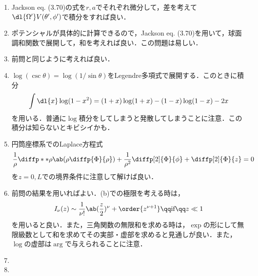 \begin{enumerate}[%
  label=%
  \fbox{%
   {\thesection.\arabic*}%
    },%
    leftmargin=3\parindent]
\begin{enumerate}[(a)]
        これらをまとめて
        \begin{gather}
          \int_0^{2\pi} \dl{\phi} V(\phi) e^{-\i m \phi} = 
          \begin{dcases}
            - \i\frac{4Vn}{m} & \text{if}\qq m = \pm n, \pm 3n, \ldots\\
            \qq 0 &\text{otherwise}
          \end{dcases}
        \end{gather}
        と書ける．
      \item (a)の結果を用いて具体的に計算を進めていくだけであるが，Jackson §3.3 eq. (3.36)との比較の時には座標軸の取り方に気をつける必要がある．具体的には，$\cos\theta' = \sin\theta \sin \phi$とすれば良い．
    \end{enumerate}
  \item Jackson eq. (3.70)の式を$r, a$でそれぞれ微分して，差を考えて$\dl{\Omega'}V(\theta' , \phi')$で積分をすれば良い．
  \item ポテンシャルが具体的に計算できるので，Jackson eq. (3.70)を用いて，球面調和関数で展開して，和を考えれば良い．この問題は易しい．
  \item 前問と同じように考えれば良い．
  \item $\log(\csc\theta) = \log(1/\sin\theta)$をLegendre多項式で展開する．このときに積分
    \begin{gather}
      \int \dl{x} \log(1 - x^2) = (1+x)\log(1+x) - (1-x)\log(1-x) - 2x
    \end{gather}
    を用いる．普通に$\log$積分をしてしまうと発散してしまうことに注意．この積分は知らないとキビシイかも．
  \item 円筒座標系でのLaplace方程式
    \begin{gather}
      \frac{1}{\rho}\diffp**{\rho}{\ab(\rho \diffp{\Phi}{\rho})} + \frac{1}{\rho^2}\diffp[2]{\Phi}{\phi} + \diffp[2]{\Phi}{z} = 0
    \end{gather}
    を$z = 0, L$での境界条件に注意して解けば良い．
  \item 前問の結果を用いればよい．(b)での極限を考える時は，
    \begin{gather}
      I_\nu(z) \sim \frac{1}{\nu !} \ab(\frac{z}{2})^\nu + \order{z^{\nu+1}} \qq \text{if} \qq z \ll 1
    \end{gather}
    を用いると良い．また，三角関数の無限和を求める時は，$\exp$の形にして無限級数として和を求めてその実部・虚部を求めると見通しが良い．また，$\log$の虚部は$\arg$で与えられることに注意．
  \item %
  \item %

\end{enumerate}
